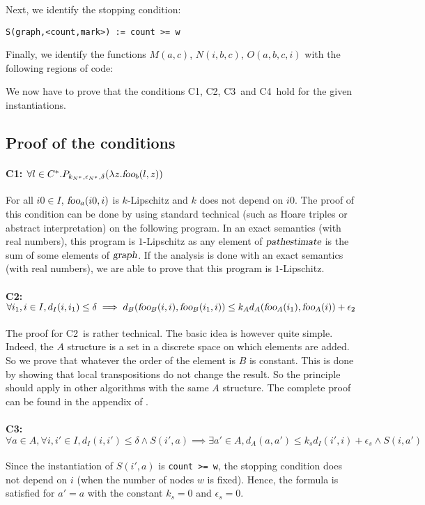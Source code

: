 \documentclass[copyright,creativecommons]{eptcs}
\newcommand{\fooa}{\hbox{\sl foo}_a}
\newcommand{\fooA}{\hbox{\sl foo}_A}
\newcommand{\foob}{\hbox{\sl foo}_b}
\newcommand{\fooB}{\hbox{\sl foo}_B}
\newcommand{\pe}{\hbox{\sl pathestimate}}
\newcommand{\graph}{\hbox{\sl graph}}
\newcommand{\Cone}{C1}
\newcommand{\Ctwo}{C2}
\newcommand{\Cthree}{C3}
\newcommand{\Cfour}{C4}
\newcommand{\Kn}{k_{N^*}}
\newcommand{\En}{\epsilon_{N^*}}
\newcommand{\AND}{\mathrel{\wedge}}
\begin{document}
Next, we  identify the stopping condition:
\begin{lstlisting}
S(graph,<count,mark>) := count >= w
\end{lstlisting}
Finally, we identify the functions $M(a,c)$, $N(i,b,c)$, $O(a,b,c,i)$
with the following regions of code:
{}

We now have to prove that the conditions \Cone, \Ctwo, \Cthree\, and
\Cfour\, hold for the given instantiations. 

\subsection{Proof of the conditions}

\paragraph{\Cone: $\forall l \in C^*. P_{\Kn,\En,\delta}(\lambda z. \foob(l,z))$}
For all $i0\in I$, $\fooa(i0,i)$ is  $k$-Lipschitz and $k$ does not depend on $i0$.
The proof of this condition can be done by using standard technical (such as Hoare
triples or abstract interpretation) on the following program.
{}
In an exact semantics (with real numbers), this program is $1$-Lipschitz as any element of $\pe$ is  the sum of some elements of $\graph$.
If the analysis is done with an exact semantics (with real numbers), we
are able to prove that this program is $1$-Lipschitz.

\paragraph{\Ctwo: $\forall i_1,i \in I, d_I(i,i_1) \leq \delta \implies
d_B( \fooB(i,i) , \fooB(i_1,i)) \leq k_A  d_A( \fooA(i_1) , \fooA(i)) + \epsilon_2$}
The proof for \Ctwo\ is rather technical. The basic idea is however
quite simple. Indeed, the $A$ structure is a set in a discrete space
on which elements are added. So we prove that whatever the order of
the element is $B$ is constant. This is done by showing that local
transpositions do not change the result. So the principle should
apply in other algorithms with the same $A$ structure. 
The complete proof can be found in the appendix of \cite{gazeau12hal}.

\paragraph{\Cthree: $\forall a \in A, \forall i,i' \in I,
d_I(i,i') \leq \delta \AND 
S(i',a) \implies \exists a' \in A, d_A(a,a') \leq k_s d_I(i',i) + \epsilon_s \AND 
S(i,a')$}
Since the instantiation of $S(i',a)$ is \lstinline{count >= w}, 
the stopping condition does not depend on $i$ (when the number of nodes $w$ is fixed).
Hence, the formula is satisfied for $a'= a$ with the constant $k_s=0$ and $\epsilon_s=0$.
\end{document}
